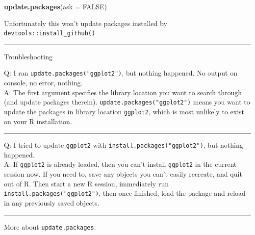 \documentclass[
]{book}
\newenvironment{Shaded}{\begin{snugshade}}{\end{snugshade}}
\newcommand{\AttributeTok}[1]{\textcolor[rgb]{0.13,0.29,0.53}{#1}}
\newcommand{\ConstantTok}[1]{\textcolor[rgb]{0.56,0.35,0.01}{#1}}
\newcommand{\FunctionTok}[1]{\textcolor[rgb]{0.13,0.29,0.53}{\textbf{#1}}}
\newcommand{\NormalTok}[1]{#1}
\theoremstyle{definition}
\theoremstyle{definition}
\theoremstyle{definition}
\theoremstyle{definition}
\theoremstyle{remark}
\begin{document}
\begin{itemize}
\begin{Shaded}
\begin{Highlighting}[]
\FunctionTok{update.packages}\NormalTok{(}\AttributeTok{ask =} \ConstantTok{FALSE}\NormalTok{)}
\end{Highlighting}
\end{Shaded}

  Unfortunately this {won't} update packages installed by \texttt{devtools::install\_github()}
\end{itemize}

\begin{center}\rule{0.5\linewidth}{0.5pt}\end{center}

{Troubleshooting}

Q: I ran \texttt{update.packages("ggplot2")}, but nothing happened. No output on console, no error, nothing.\\
A: The first argument specifies the library location you want to search through (and update packages therein). \texttt{update.packages("ggplot2")} means you want to update the packages in library location \texttt{ggplot2}, which is most {unlikely} to exist on your R installation.

\begin{center}\rule{0.5\linewidth}{0.5pt}\end{center}

Q: I tried to update \texttt{ggplot2} with \texttt{install.packages("ggplot2")}, but nothing happened.\\
A: {If \texttt{ggplot2} is already loaded}, then you can't install \texttt{ggplot2} in the current session now. If you need to, save any objects you can't easily recreate, and quit out of R. Then start a new R session, immediately run \texttt{install.packages("ggplot2")}, then once finished, load the package and reload in any previously saved objects.

\begin{center}\rule{0.5\linewidth}{0.5pt}\end{center}

More about \texttt{update.packages}:
\end{document}
